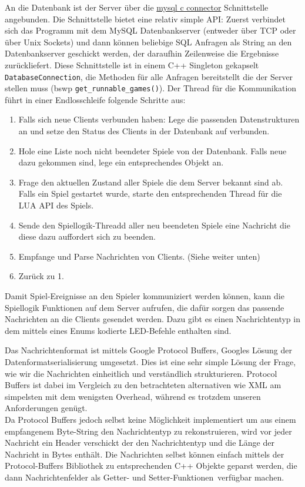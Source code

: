 An die Datenbank ist der Server über die \href{https://dev.mysql.com/doc/connector-c/en/connector-c-introduction.html}{mysql c connector} Schnittstelle angebunden. Die Schnittstelle bietet eine relativ simple API: Zuerst verbindet sich das Programm mit dem MySQL Datenbankserver (entweder über TCP oder über Unix Sockets) und dann können beliebige SQL Anfragen als String an den Datenbankserver geschickt werden, der daraufhin Zeilenweise die Ergebnisse zurückliefert.
Diese Schnittstelle ist in einem C++ Singleton gekapselt \texttt{DatabaseConnection}, die Methoden für alle Anfragen
bereitstellt die der Server stellen muss (bswp \texttt{get\_runnable\_games()}). \newline
\newline
Der Thread für die Kommunikation führt in einer Endlosschleife folgende Schritte aus:
\begin{enumerate}
    \item Falls sich neue Clients verbunden haben: Lege die passenden Datenstrukturen an und setze den Status des Clients in der Datenbank auf verbunden.
    \item Hole eine Liste noch nicht beendeter Spiele von der Datenbank. Falls neue dazu gekommen sind, lege ein entsprechendes Objekt an.
    \item Frage den aktuellen Zustand aller Spiele die dem Server bekannt sind ab. Falls ein Spiel gestartet wurde, starte den entsprechenden Thread für die LUA API des Spiels.
    \item Sende den Spiellogik-Threadd aller neu beendeten Spiele eine Nachricht die diese dazu auffordert sich zu beenden.
    \item Empfange und Parse Nachrichten von Clients. (Siehe weiter unten)
    \item Zurück zu 1.
\end{enumerate}

Damit Spiel-Ereignisse an den Spieler kommuniziert werden können, kann die Spiellogik Funktionen auf dem Server aufrufen, die dafür sorgen das passende Nachrichten an die Clients gesendet werden. Dazu gibt es einen Nachrichtentyp in dem mittels eines Enums kodierte LED-Befehle enthalten sind. 

Das Nachrichtenformat ist mittels Google Protocol Buffers, Googles Lösung der Datenformatserialisierung umgesetzt. Dies ist eine sehr simple Lösung der Frage, wie wir die Nachrichten einheitlich und verständlich strukturieren. Protocol Buffers ist dabei im Vergleich zu den betrachteten alternativen wie XML am simpelsten mit dem wenigsten Overhead, während es trotzdem unseren Anforderungen genügt.\\
 Da Protocol Buffers jedoch selbst keine Möglichkeit
implementiert um aus einem empfangenem Byte-String den Nachrichtentyp zu rekonstruieren, wird vor jeder Nachricht
ein Header verschickt der den Nachrichtentyp und die Länge der Nachricht in Bytes enthält.
Die Nachrichten selbst können einfach mittels der Protocol-Buffers Bibliothek zu entsprechenden C++ Objekte geparst werden, die dann Nachrichtenfelder als \glqq Getter- und Setter-Funktionen\grqq \, verfügbar machen.


